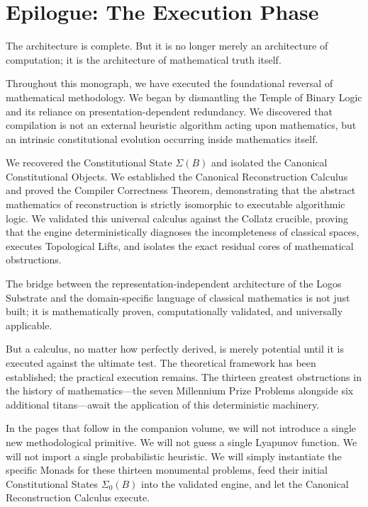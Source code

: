 \documentclass[12pt,openany]{extbook}
\theoremstyle{plain}
\theoremstyle{definition}
\begin{document}
\backmatter

\chapter*{Epilogue: The Execution Phase}

The architecture is complete. But it is no longer merely an architecture of computation; it is the architecture of mathematical truth itself.

Throughout this monograph, we have executed the foundational reversal of mathematical methodology. We began by dismantling the Temple of Binary Logic and its reliance on presentation-dependent redundancy. We discovered that compilation is not an external heuristic algorithm acting upon mathematics, but an intrinsic constitutional evolution occurring inside mathematics itself.

We recovered the Constitutional State $\Sigma(B)$ and isolated the Canonical Constitutional Objects. We established the Canonical Reconstruction Calculus and proved the Compiler Correctness Theorem, demonstrating that the abstract mathematics of reconstruction is strictly isomorphic to executable algorithmic logic. We validated this universal calculus against the Collatz crucible, proving that the engine deterministically diagnoses the incompleteness of classical spaces, executes Topological Lifts, and isolates the exact residual cores of mathematical obstructions.

The bridge between the representation-independent architecture of the Logos Substrate and the domain-specific language of classical mathematics is not just built; it is mathematically proven, computationally validated, and universally applicable.

But a calculus, no matter how perfectly derived, is merely potential until it is executed against the ultimate test. The theoretical framework has been established; the practical execution remains. The thirteen greatest obstructions in the history of mathematics---the seven Millennium Prize Problems alongside six additional titans---await the application of this deterministic machinery.

In the pages that follow in the companion volume, we will not introduce a single new methodological primitive. We will not guess a single Lyapunov function. We will not import a single probabilistic heuristic. We will simply instantiate the specific Monads for these thirteen monumental problems, feed their initial Constitutional States $\Sigma_0(B)$ into the validated engine, and let the Canonical Reconstruction Calculus execute.
\end{document}
